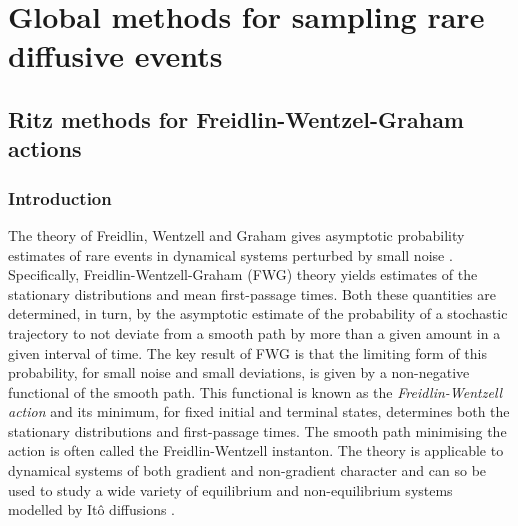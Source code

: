 \part{Global methods for sampling rare diffusive events}

\chapter{Ritz methods for Freidlin-Wentzel-Graham actions} \label{ch:Ritz methods for Freidlin-Wentzel-Graham actions}

\section{Introduction}

The theory of Freidlin, Wentzell and Graham \citep{wentzellSmallRandomPerturbations1970, graham1973statistical,graham1987macroscopic}
gives asymptotic probability estimates of rare events in dynamical
systems perturbed by small noise \citep{bolhuisTransitionPathSampling2002a, allen2005sampling, allen2009forward, ebenerInstantonBasedImportance2019b}.
Specifically, Freidlin-Wentzell-Graham (FWG) theory yields estimates of the stationary
distributions and mean first-passage times. Both these quantities
are determined, in turn, by the asymptotic estimate of the probability
of a stochastic trajectory to not deviate from a smooth path by more
than a given amount in a given interval of time. The key result of
FWG is that the limiting form of this probability,
for small noise and small deviations, is given by a non-negative functional
of the smooth path. This functional is known as the \textit{Freidlin-Wentzell action} and its minimum, for fixed initial and terminal states, determines
both the stationary distributions and first-passage times. The smooth
path minimising the action is often called the Freidlin-Wentzell instanton.
The theory is applicable to dynamical systems of both gradient and
non-gradient character and can so be used to study a wide variety
of equilibrium and non-equilibrium systems modelled by Itô diffusions
\citep{paninskiMostLikelyVoltage2006a, huangMolecularMathematicalBasis2012a, bouchet2016generalisation, maier1996scaling, wolynesNavigatingFoldingRoutes1995a, noltingBallsCupsQuasipotentials2016a, mangelBarrierTransitionsDriven1994a, gardnerConstructionGeneticToggle2000a, demarcoPhaseTransitionModel2001a, nelson1987stochastic}.

